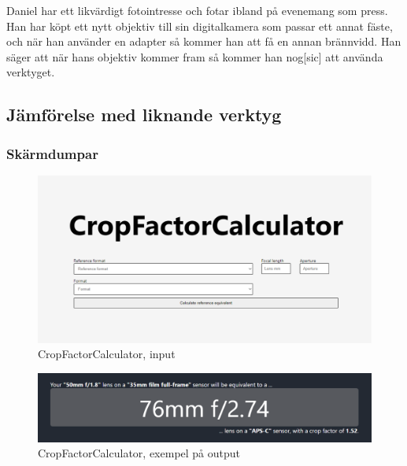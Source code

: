 \documentclass[11pt]{article}
\begin{document}
Daniel har ett likvärdigt fotointresse och fotar ibland på evenemang som press.
Han har köpt ett nytt objektiv till sin digitalkamera som passar ett annat
fäste, och när han använder en adapter så kommer han att få en annan brännvidd.
Han säger att när hans objektiv kommer fram så kommer han nog[sic] att använda
verktyget. \par
\fussy

\clearpage

\subsection{Jämförelse med liknande verktyg}
\subsubsection{Skärmdumpar}
\renewcommand{\figurename}{Fig.}

\begin{subfigures}

\begin{figure}[!htb]
\caption{CropFactorCalculator, input}
\includegraphics[width=\textwidth]{cfc-in}
\end{figure}

\begin{figure}[!htb]
\caption{CropFactorCalculator, exempel på output}
\includegraphics[width=\textwidth]{cfc-out}
\end{figure}

\end{subfigures}
\end{document}
